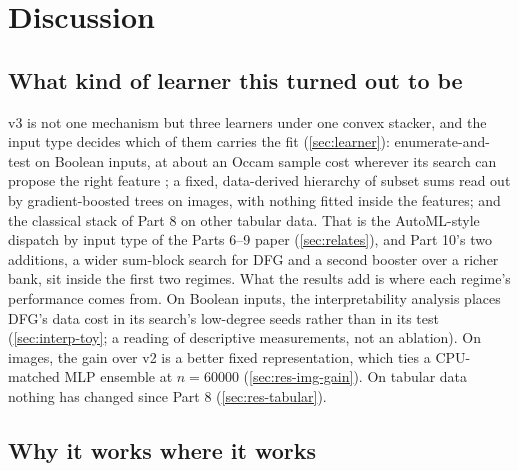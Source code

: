 \section{Discussion}\label{sec:discussion}

\subsection{What kind of learner this turned out to be}\label{sec:disc-kind}

v3 is not one mechanism but three learners under one convex stacker, and the input type decides which of them carries the fit (\cref{sec:learner}): enumerate-and-test on Boolean inputs, at about an Occam sample cost wherever its search can propose the right feature ; a fixed, data-derived hierarchy of subset sums read out by gradient-boosted trees on images, with nothing fitted inside the features; and the classical stack of Part 8 on other tabular data. That is the AutoML-style dispatch by input type of the Parts 6--9 paper (\cref{sec:relates}), and Part 10's two additions, a wider sum-block search for DFG and a second booster over a richer bank, sit inside the first two regimes. What the results add is where each regime's performance comes from. On Boolean inputs, the interpretability analysis places DFG's data cost in its search's low-degree seeds rather than in its test (\cref{sec:interp-toy}; a reading of descriptive measurements, not an ablation). On images, the gain over v2 is a better fixed representation, which ties a CPU-matched MLP ensemble at $n=60000$ (\cref{sec:res-img-gain}). On tabular data nothing has changed since Part 8 (\cref{sec:res-tabular}).

\subsection{Why it works where it works}\label{sec:disc-why}

